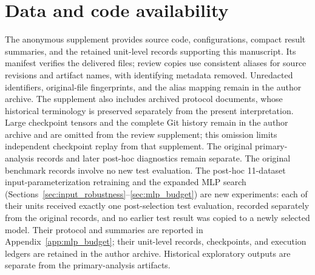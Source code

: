 \documentclass[10pt]{article}
\begin{document}
\section*{Data and code availability}
The anonymous supplement provides source code, configurations, compact result summaries, and the retained unit-level records supporting this manuscript. Its manifest verifies the delivered files; review copies use consistent aliases for source revisions and artifact names, with identifying metadata removed. Unredacted identifiers, original-file fingerprints, and the alias mapping remain in the author archive. The supplement also includes archived protocol documents, whose historical terminology is preserved separately from the present interpretation. Large checkpoint tensors and the complete Git history remain in the author archive and are omitted from the review supplement; this omission limits independent checkpoint replay from that supplement. The original primary-analysis records and later post-hoc diagnostics remain separate. The original benchmark records involve no new test evaluation. The post-hoc 11-dataset input-parameterization retraining and the expanded MLP search (Sections~\ref{sec:input_robustness}--\ref{sec:mlp_budget}) are new experiments: each of their units received exactly one post-selection test evaluation, recorded separately from the original records, and no earlier test result was copied to a newly selected model. Their protocol and summaries are reported in Appendix~\ref{app:mlp_budget}; their unit-level records, checkpoints, and execution ledgers are retained in the author archive. Historical exploratory outputs are separate from the primary-analysis artifacts.




\clearpage
\appendix





\end{document}
